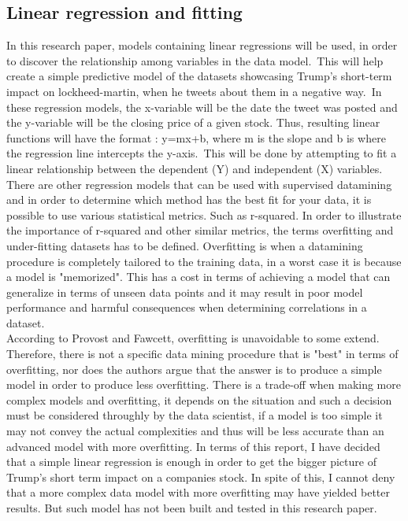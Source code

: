 \documentclass[12pt]{article}
\begin{document}
\subsection{Linear regression and fitting}
In this research paper, models containing linear regressions will be used, in order to discover the relationship among variables in the data model.\ This will help create a simple predictive model of the datasets showcasing Trump's short-term impact on lockheed-martin, when he tweets about them in a negative way.\ In these regression models, the x-variable will be the date the tweet was posted and the y-variable will be the closing price of a given stock. Thus, resulting linear functions will have the format : y=mx+b, where m is the slope and b is where the regression line intercepts the y-axis.\ This will be done by attempting to fit a linear relationship between the dependent (Y) and independent (X) variables. \citep{foster} \\

There are other regression models that can be used with supervised datamining and in order to determine which method has the best fit for your data, it is possible to use various statistical metrics. Such as r-squared. In order to illustrate the importance of r-squared and other similar metrics, the terms overfitting and under-fitting datasets has to be defined. Overfitting is when a datamining procedure is completely tailored to the training data, in a worst case it is because a model is "memorized". This has a cost in terms of achieving a model that can generalize in terms of unseen data points and it may result in poor model performance and harmful consequences when determining correlations in a dataset. \citep{foster}\\

According to Provost and Fawcett, overfitting is unavoidable to some extend. Therefore, there is not a specific data mining procedure that is "best" in terms of overfitting, nor does the authors argue that the answer is to produce a simple model in order to produce less overfitting. There is a trade-off when making more complex models and overfitting, it depends on the situation and such a decision must be considered throughly by the data scientist, if a model is too simple it may not convey the actual complexities and thus will be less accurate than an advanced model with more overfitting. In terms of this report, I have decided that a simple linear regression is enough in order to get the bigger picture of Trump's short term impact on a companies stock. In spite of this, I cannot deny that a more complex data model with more overfitting may have yielded better results. But such model has not been built and tested in this research paper.\citep{foster} \\
\end{document}
